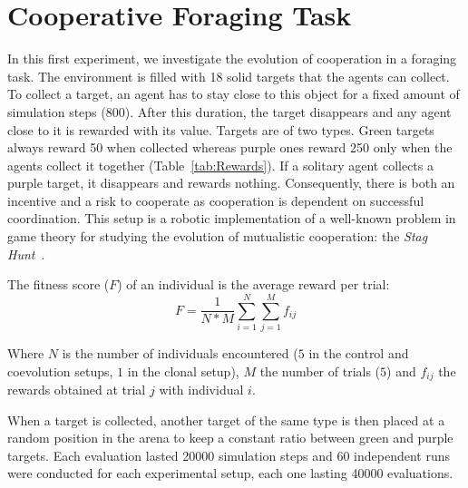 \section{Cooperative Foraging Task}
  
  In this first experiment, we investigate the evolution of cooperation in a foraging task. The environment is filled with 18 solid targets that the agents can collect. To collect a target, an agent has to stay close to this object for a fixed amount of simulation steps (800). After this duration, the target disappears and any agent close to it is rewarded with its value. Targets are of two types. Green targets always reward 50 when collected whereas purple ones reward 250 only when the agents collect it together (Table~\ref{tab:Rewards}). If a solitary agent collects a purple target, it disappears and rewards nothing. Consequently, there is both an incentive and a risk to cooperate as cooperation is dependent on successful coordination. This setup is a robotic implementation of a well-known problem in game theory for studying the evolution of mutualistic cooperation: the {\em Stag Hunt}~\parencite{Skyrms2004}.

  The fitness score (\(F\)) of an individual is the average reward per trial:
 \[
  F = \frac{1}{N*M} \sum_{i=1}^{N} \sum_{j=1}^{M} f_{ij}
  \]
  
  Where \(N\) is the number of individuals encountered ($5$ in the control and coevolution setups, $1$ in the clonal setup), \(M\) the number of trials ($5$) and \(f_{ij}\) the rewards obtained at trial \(j\) with individual \(i\).

  When a target is collected, another target of the same type is then placed at a random position in the arena to keep a constant ratio between green and purple targets. Each evaluation lasted 20000 simulation steps and 60 independent runs were conducted for each experimental setup, each one lasting 40000 evaluations.

  \begin{table}[h]
    \caption{\textbf{Rewards for the foraging of the different targets.}
    Rewards depend on whether they were collected alone or cooperatively.}
    \label{tab:Rewards}
  \end{table}

